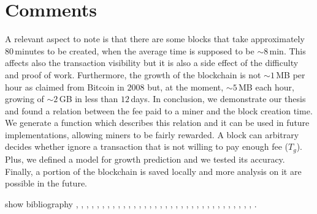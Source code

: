 \documentclass[USenglish]{uit-thesis}
\begin{document}
\section{Comments}
\label{sec:comments}
A relevant aspect to note is that there are some blocks
that take approximately $80$\,minutes to be created, when the
average time is supposed to be $\sim8$\,min. This affects also the
transaction visibility but it is also a side effect of the difficulty
and proof of work. Furthermore, the growth of the blockchain
is not $\sim1$\,MB per hour as claimed from Bitcoin in $2008$
but, at the moment, $\sim5$\,MB each hour, growing of $\sim2$\,GB in less than $12$\,days.
In conclusion, we demonstrate our thesis and found a relation between the fee paid to a miner
and the block creation time. We generate a function which describes this relation and it can
be used in future implementations, allowing miners to be fairly rewarded.
A block can arbitrary decides whether ignore a transaction
that is not willing to pay enough fee ($T_g$).
Plus, we defined a model for growth prediction and we tested its accuracy. Finally, a portion of
the blockchain is saved locally and more analysis on it are possible in the future.

show bibliography \cite{Nakamoto_bitcoin}, \cite{ethereum}, \cite{Back02hashcash},
\cite{Dwork:1992}, \cite{Luu:2016}, \cite{Delmolino2016},
\cite{ethereum_white_paper}, \cite{ethereum_solidity}, \cite{Luu:2015:DIC},
\cite{sha}, \cite{Hopcroft:2006:IAT}, \cite{Johansen2015Fireflies}, \cite{bitcoinmining},
\cite{Garcia:2011:EMB}, \cite{vandiver2007hrdb},
\cite{Luiz:2014:MBF}, \cite{bitcoin_api}, \cite{ethereum_api}, \cite{merkle_tree}, \cite{ethereum_wiki_patricia_tree},
\cite{swan2015blockchain}, \cite{Baran1964:ODC}, \cite{Stallings:2002:CNS}, \cite{bitcoin_blockchain}, \cite{ethereum_bc_analysis}, \cite{ethereum_blockchain}, \cite{bitcoinmining_process},
\cite{tradeblock}, \cite{ethereum_website}, \cite{Larman:2004:AUP},
\cite{Aho:1992:FCS}, \cite{matplotlib}, \cite{croman2016}, \cite{DBLP:journals/corr/EyalGSR15},
\cite{Hildebrand:1987:INA}.




\end{document}
